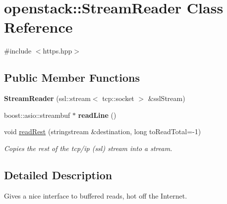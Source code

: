 \hypertarget{classopenstack_1_1StreamReader}{
\section{openstack::StreamReader Class Reference}
\label{classopenstack_1_1StreamReader}
}


{\ttfamily \#include $<$https.hpp$>$}

\subsection*{Public Member Functions}
\begin{DoxyCompactItemize}
\item 
\hypertarget{classopenstack_1_1StreamReader_ac546a8ab7e9c0658e53d620a4aa5967c}{
{\bfseries StreamReader} (ssl::stream$<$ tcp::socket $>$ \&sslStream)}
\label{classopenstack_1_1StreamReader_ac546a8ab7e9c0658e53d620a4aa5967c}

\item 
\hypertarget{classopenstack_1_1StreamReader_ab9a474d176cf53705d9c47c3ebfcf466}{
boost::asio::streambuf $\ast$ {\bfseries readLine} ()}
\label{classopenstack_1_1StreamReader_ab9a474d176cf53705d9c47c3ebfcf466}

\item 
void \hyperlink{classopenstack_1_1StreamReader_af5252596a338fceedd24ef85455600be}{readRest} (stringstream \&destination, long toReadTotal=-\/1)
\begin{DoxyCompactList}\small\item\em Copies the rest of the tcp/ip (ssl) stream into a stream. \item\end{DoxyCompactList}\end{DoxyCompactItemize}


\subsection{Detailed Description}
Gives a nice interface to buffered reads, hot off the Internet. 

